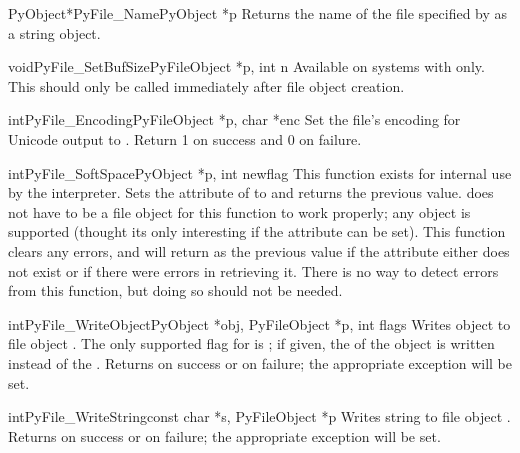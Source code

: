 \begin{cfuncdesc}{PyObject*}{PyFile_Name}{PyObject *p}
  Returns the name of the file specified by  as a string
  object.
\end{cfuncdesc}

\begin{cfuncdesc}{void}{PyFile_SetBufSize}{PyFileObject *p, int n}
  Available on systems with 
  only.  This should only be called immediately after file object
  creation.
\end{cfuncdesc}

\begin{cfuncdesc}{int}{PyFile_Encoding}{PyFileObject *p, char *enc}
  Set the file's encoding for Unicode output to . Return
  1 on success and 0 on failure.
\end{cfuncdesc}

\begin{cfuncdesc}{int}{PyFile_SoftSpace}{PyObject *p, int newflag}
  This function exists for internal use by the interpreter.  Sets the
   attribute of  to  and
  returns the
  previous value.   does not have to be a file object for this
  function to work properly; any object is supported (thought its only
  interesting if the  attribute can be set).  This
  function clears any errors, and will return  as the previous
  value if the attribute either does not exist or if there were errors
  in retrieving it.  There is no way to detect errors from this
  function, but doing so should not be needed.
\end{cfuncdesc}

\begin{cfuncdesc}{int}{PyFile_WriteObject}{PyObject *obj, PyFileObject *p,
                                           int flags}
  Writes object  to file object .  The only supported
  flag for  is
  ; if given, the
   of the object is written instead of the
  .  Returns  on success or  on
  failure; the appropriate exception will be set.
\end{cfuncdesc}

\begin{cfuncdesc}{int}{PyFile_WriteString}{const char *s, PyFileObject *p}
  Writes string  to file object .  Returns  on
  success or  on failure; the appropriate exception will be
  set.
\end{cfuncdesc}


